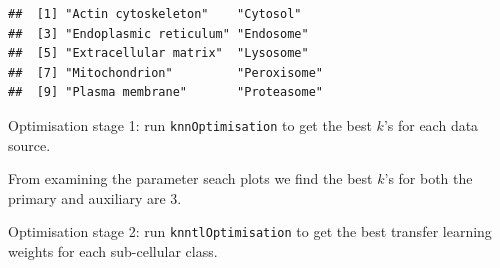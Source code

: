 \begin{verbatim}
##  [1] "Actin cytoskeleton"    "Cytosol"              
##  [3] "Endoplasmic reticulum" "Endosome"             
##  [5] "Extracellular matrix"  "Lysosome"             
##  [7] "Mitochondrion"         "Peroxisome"           
##  [9] "Plasma membrane"       "Proteasome"
\end{verbatim}

Optimisation stage 1: run \texttt{knnOptimisation} to get the best $k$'s
for each data source.

\begin{Shaded}
\begin{Highlighting}[]
\StringTok{ } \NormalTok{)}
\StringTok{ } \NormalTok{)}
\end{Highlighting}
\end{Shaded}

From examining the parameter seach plots we find the best $k$'s for both
the primary and auxiliary are 3.

Optimisation stage 2: run \texttt{knntlOptimisation} to get the best
transfer learning weights for each sub-cellular class.

\begin{Shaded}
\begin{Highlighting}[]
\StringTok{ } \NormalTok{)}

\StringTok{ }
                            \NormalTok{,}
                            \NormalTok{, }
                            \NormalTok{,}
                            \NormalTok{, } \NormalTok{(}\NormalTok{, }\NormalTok{),}
                            
  \NormalTok{)}
\end{Highlighting}
\end{Shaded}

